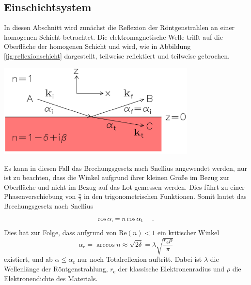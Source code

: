 \documentclass[captions=tableheading]{scrartcl}
\newcommand{\indx}[1]{\text{#1}}
\newcommand{\RE}[1]{\mathrm{Re} \left(#1 \right)}
\begin{document}
\subsection{Einschichtsystem}
In diesen Abschnitt wird zunächst die Reflexion der Röntgenstrahlen an einer homogenen Schicht betrachtet.
Die elektromagnetische Welle trifft auf die Oberfläche der homogenen Schicht und wird, wie in Abbildung \ref{fig:reflexionschicht} dargestellt, teilweise reflektiert und teilweise gebrochen.
\begin{center}
	\includegraphics[width=10cm]{images/reflexionschicht.png}
	\label{fig:reflexionschicht}
\end{center}
Es kann in diesen Fall das Brechungsgesetz nach Snellius angewendet werden, nur ist zu beachten, dass die Winkel aufgrund ihrer kleinen Größe im Bezug zur Oberfläche und nicht im Bezug auf das Lot gemessen werden. 
Dies führt zu einer Phasenverschiebung von $\frac{\pi}{2}$ in den trigonometrischen Funktionen.
Somit lautet das Brechungsgesetz nach Snellius
\begin{equation}
\cos \alpha_{\indx{i}}=n\cos \alpha_{\indx{t}} \hspace{0.5cm}\text{.}
\end{equation}
Dies hat zur Folge, dass aufgrund von $\RE{n}<1 $ ein kritischer Winkel
\begin{equation}
\alpha_{\indx{c}}=\arccos n \approx \sqrt{2\delta } = \lambda \sqrt{\frac{r_{\indx{e}} \rho}{\pi}}
\label{eq:elektronendichte}
\end{equation}
existiert, und ab $\alpha \le \alpha_{\indx{c}}$ nur noch Totalreflexion auftritt.
Dabei ist $\lambda$ die Wellenlänge der Röntgenstrahlung, $r_{\indx{e}}$ der klassische Elektronenradius und $\rho$ die Elektronendichte des Materials. 
\end{document}
